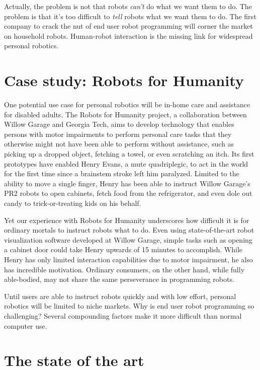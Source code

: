 \documentclass{article}
\begin{document}
Actually, the problem is not that robots {\em can't} do what we want them to do. The problem is that it's too difficult to {\em tell} robots what we want them to do. The first company to crack the nut of end user robot programming will corner the market on household robots. Human-robot interaction is the missing link for widespread personal robotics.

\section{Case study: Robots for Humanity}

One potential use case for personal robotics will be in-home care and assistance for disabled adults. The Robots for Humanity project, a collaboration between Willow Garage and Georgia Tech, aims to develop technology that enables persons with motor impairments to perform personal care tasks that they otherwise might not have been able to perform without assistance, such as picking up a dropped object, fetching a towel, or even scratching an itch. Its first prototypes have enabled Henry Evans, a mute quadriplegic, to act in the world for the first time since a brainstem stroke left him paralyzed. Limited to the ability to move a single finger, Henry has been able to instruct Willow Garage's PR2 robots to open cabinets, fetch food from the refrigerator, and even dole out candy to trick-or-treating kids on his behalf.

Yet our experience with Robots for Humanity underscores how difficult it is for ordinary mortals to instruct robots what to do. Even using state-of-the-art robot visualization software developed at Willow Garage, simple tasks such as opening a cabinet door could take Henry upwards of 15 minutes to accomplish.  While Henry has only limited interaction capabilities due to motor impairment, he also has incredible motivation. Ordinary consumers, on the other hand, while fully able-bodied, may not share the same perseverance in programming robots.

Until users are able to instruct robots quickly and with low effort, personal robotics will be limited to niche markets.  Why is end user robot programming so challenging? Several compounding factors make it more difficult than normal computer use.

\section{The state of the art}
\end{document}
